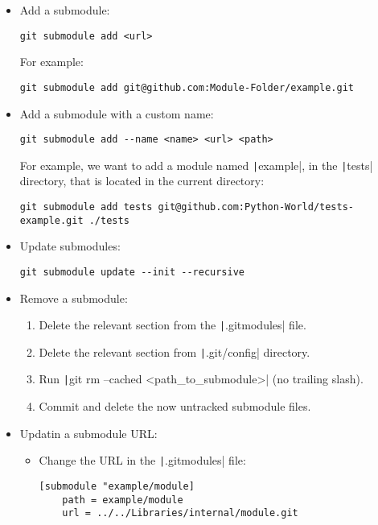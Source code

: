 \begin{itemize}
    \item Add a submodule:
    \begin{verbatim}
git submodule add <url>
    \end{verbatim}
    For example:
    \begin{verbatim}
git submodule add git@github.com:Module-Folder/example.git
    \end{verbatim}
    \item Add a submodule with a custom name:
    \begin{verbatim}
git submodule add --name <name> <url> <path>
    \end{verbatim}
    For example, we want to add a module named \texttt|example|, in the
    \texttt|tests| directory, that is located in the current
    directory:
    \begin{verbatim}
git submodule add tests git@github.com:Python-World/tests-example.git ./tests
    \end{verbatim}
    \item Update submodules:
    \begin{verbatim}
git submodule update --init --recursive
    \end{verbatim}
    \item Remove a submodule:
    \begin{enumerate}
        \item Delete the relevant section from the \texttt|.gitmodules| file.
        \item Delete the relevant section from \texttt|.git/config| directory.
        \item Run \texttt|git rm --cached <path_to_submodule>| (no trailing slash).
        \item Commit and delete the now untracked submodule files.
    \end{enumerate}
    \item Updatin a submodule URL:
    \begin{itemize}
        \item Change the URL in the \texttt|.gitmodules| file:
        \begin{verbatim}
[submodule "example/module]
    path = example/module
    url = ../../Libraries/internal/module.git
        \end{verbatim}

\end{itemize}
\end{itemize}
